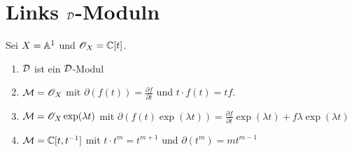 
\chapter{Links $\mathcal{D}$-Moduln}

\begin{exmp}
Sei $X=\mathbb{A}^1$ und $\mathscr{O}_X=\mathbb{C}[t]$.
\begin{enumerate}
\item $\mathcal{D}$ ist ein $\mathcal{D}$-Modul
\item $\mathcal{M}=\mathscr{O}_X$ mit $\partial(f(t))=\frac{\partial f}{\partial t}$ und
$t\cdot f(t)=tf$.
\item $\mathcal{M}=\mathscr{O}_X\exp(\lambda t)$ mit $\partial(f(t)\exp(\lambda
t))=\frac{\partial f}{\partial t}\exp(\lambda t)+f\lambda\exp(\lambda t)$
\item $\mathcal{M}=\mathbb{C}[t,t^{-1}]$ mit $t\cdot t^{m}=t^{m+1}$ und
$\partial(t^m)=mt^{m-1}$
\end{enumerate}
\end{exmp}

\begin{comment}

  \section{Lokalisierung eines $\C\{x\}$-Moduls}

  \begin{defn}
    Sei $M$ ein $\C\{x\}$-Modul und $K=\C\{x\}[x^{-1}]$, dann ist die
    Lokalisierung
    \[ M[x^{-1}]:=M\otimes_{\C\{x\}}K \,. \]
  \end{defn}

  \section{Lokalisierung eines holonomen $\cD$-Moduls}
\end{comment}

